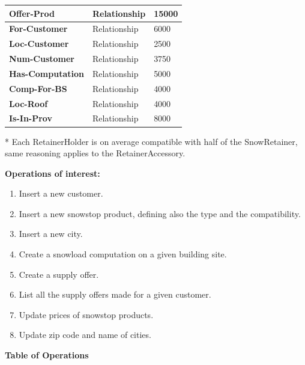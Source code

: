 \documentclass{article}[h]
\begin{document}
{\begin{table}[H]
\begin{tabular}{ | m{4.5cm} | m{4.5cm}| m{4.5cm} |}
    \hline
    \color[HTML]{3531FF} \textbf{Offer-Prod} & Relationship & 15000\\ 
    \hline
    \color[HTML]{3531FF} \textbf{For-Customer} & Relationship & 6000\\ 
    \hline
    \color[HTML]{3531FF} \textbf{Loc-Customer} & Relationship & 2500\\ 
    \hline
    \color[HTML]{3531FF} \textbf{Num-Customer} & Relationship & 3750 \\ 
    \hline
    \color[HTML]{3531FF} \textbf{Has-Computation} & Relationship & 5000\\ 
    \hline
    \color[HTML]{3531FF} \textbf{Comp-For-BS} & Relationship & 4000\\ 
    \hline
    \color[HTML]{3531FF} \textbf{Loc-Roof} & Relationship & 4000\\ 
    \hline
    \color[HTML]{3531FF} \textbf{Is-In-Prov} & Relationship & 8000 \\ 
    \hline
  \end{tabular}
\end{table}
\small{* Each RetainerHolder is on average compatible with half of the SnowRetainer, same reasoning applies to the RetainerAccessory.}

\pagebreak

\textbf{Operations of interest:}

\begin{enumerate}
  \item Insert a new customer.
  \item Insert a new snowstop product, defining also the type and the compatibility.
  \item Insert a new city.
  \item Create a snowload computation on a given building site.
  \item Create a supply offer.
  \item List all the supply offers made for a given customer.
  \item Update prices of snowstop products.
  \item Update zip code and name of cities.
\end{enumerate}

\vspace{12px}

{\centering \textbf{Table of Operations}\\}

}
\end{document}
